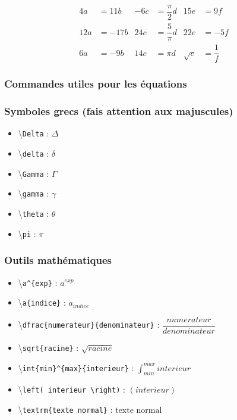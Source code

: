 \documentclass[a4paper, 10pt]{article}
\newcommand{\command}[1]{
  \colorbox{codebackground}{\scriptsize{\textbackslash}\texttt{#1}}
}
\begin{document}
\begin{align}
  4a  &= 11b  & -6c  &= \dfrac{\pi}{2}d & 15e      &= 9f \\
  12a &= -17b & 24c  &= \dfrac{5}{\pi}d & 22e      &= -5f \\
  6a  &= -9b  & 14c  &= \pi d           & \sqrt{e} &= \dfrac{1}{f}
\end{align}

\subsubsection{Commandes utiles pour les équations}

\subsubsection{Symboles grecs (fais attention aux majuscules)}

\begin{itemize}
  \item \command{Delta}: $\Delta$
  \item \command{delta}: $\delta$
  \item \command{Gamma}: $\Gamma$
  \item \command{gamma}: $\gamma$
  \item \command{theta}: $\theta$
  \item \command{pi}   : $\pi$
\end{itemize}

\subsubsection{Outils mathématiques}

\begin{itemize}
  \item \command{a\textasciicircum\{exp\}}:
      $a^{exp}$
  \item \command{a\textunderscore\{indice\}}:
      $a_{indice}$
  \item \command{dfrac\{numerateur\}\{denominateur\}}:
      $\dfrac{numerateur}{denominateur}$
  \item \command{sqrt\{racine\}}:
      $\sqrt{racine}$
  \item \command{int\textunderscore\{min\}\textasciicircum\{max\}\{interieur\}}:
      $\int_{min}^{max}{interieur}$
  \item \command{left( interieur \textbackslash right)}:
      $\left(interieur\right)$
  \item \command{textrm\{texte normal\}}:
      $\textrm{texte normal}$
\end{itemize}
\end{document}
